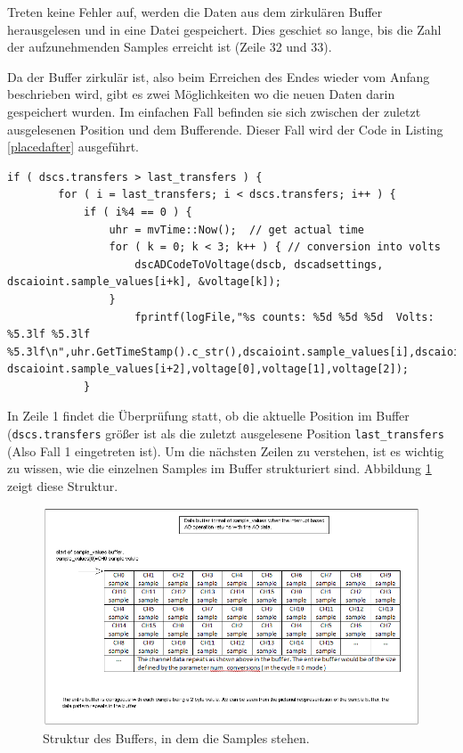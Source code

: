 \documentclass[12pt,a4paper]{scrartcl}
\begin{document}
Treten keine Fehler auf, werden die Daten aus dem zirkulären Buffer herausgelesen und in eine Datei gespeichert.
Dies geschiet so lange, bis die Zahl der aufzunehmenden Samples erreicht ist (Zeile 32 und 33).

Da der Buffer zirkulär ist, also beim Erreichen des Endes wieder vom Anfang beschrieben wird, gibt es zwei Möglichkeiten wo die neuen Daten darin gespeichert wurden. Im einfachen Fall befinden sie sich zwischen der zuletzt ausgelesenen Position und dem Bufferende. Dieser Fall wird der Code in Listing \ref{placedafter} ausgeführt. 

\begin{lstlisting}[frame=trBL]
	if ( dscs.transfers > last_transfers ) {
		for ( i = last_transfers; i < dscs.transfers; i++ ) {
			if ( i%4 == 0 ) {
				uhr = mvTime::Now();  // get actual time
				for ( k = 0; k < 3; k++ ) { // conversion into volts
					dscADCodeToVoltage(dscb, dscadsettings, dscaioint.sample_values[i+k], &voltage[k]);
				}
					fprintf(logFile,"%s counts: %5d %5d %5d  Volts: %5.3lf %5.3lf %5.3lf\n",uhr.GetTimeStamp().c_str(),dscaioint.sample_values[i],dscaioint.sample_values[i+1], dscaioint.sample_values[i+2],voltage[0],voltage[1],voltage[2]);
			}
\end{lstlisting}		

In Zeile 1 findet die Überprüfung statt, ob die aktuelle Position im Buffer (\texttt{dscs.transfers} größer ist als die zuletzt ausgelesene Position \texttt{last\_transfers} (Also Fall 1 eingetreten ist). 
Um die nächsten Zeilen zu verstehen, ist es wichtig zu wissen, wie die einzelnen Samples im Buffer strukturiert sind. Abbildung \ref{samplebuffer} zeigt diese Struktur. 

\begin{figure}[H]
\centering
\includegraphics[scale=.55]{samplebuffer.png}
\caption{Struktur des Buffers, in dem die Samples stehen. \citep{Systems:2008uq}}
\label{samplebuffer}
\end{figure}
\end{document}
